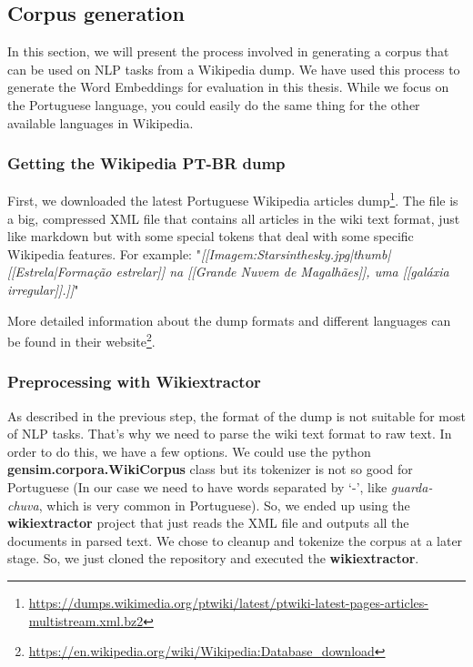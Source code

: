 \subsection{Corpus generation}\label{chap:methodsandmaterials:corpus}

In this section, we will present the process involved in generating a corpus that can be used on NLP tasks from a Wikipedia dump. We have used this process to generate the Word Embeddings for evaluation in this thesis. While we focus on the Portuguese language, you could easily do the same thing for the other available languages in Wikipedia.

\subsubsection{Getting the Wikipedia PT-BR dump}

First, we downloaded the latest Portuguese Wikipedia articles dump\footnote{\url{https://dumps.wikimedia.org/ptwiki/latest/ptwiki-latest-pages-articles-multistream.xml.bz2}}. The file is a big, compressed XML file that contains all articles in the wiki text format, just like markdown but with some special tokens that deal with some specific Wikipedia features. For example: "\textit{[[Imagem:Starsinthesky.jpg|thumb|[[Estrela|Formação estrelar]] na [[Grande Nuvem de Magalhães]], uma [[galáxia irregular]].]]}"

More detailed information about the dump formats and different languages can be found in their website\footnote{\url{https://en.wikipedia.org/wiki/Wikipedia:Database_download}}.

\subsubsection{Preprocessing with Wikiextractor}

As described in the previous step, the format of the dump is not suitable for most of NLP tasks. That’s why we need to parse the wiki text format to raw text. In order to do this, we have a few options. We could use the python \textbf{gensim.corpora.WikiCorpus} class but its tokenizer is not so good for Portuguese (In our case we need to have words separated by ‘-’, like \textit{guarda-chuva}, which is very common in Portuguese). So, we ended up using the \textbf{wikiextractor} project that just reads the XML file and outputs all the documents in parsed text. We chose to cleanup and tokenize the corpus at a later stage. So, we just cloned the repository and executed the \textbf{wikiextractor}.

